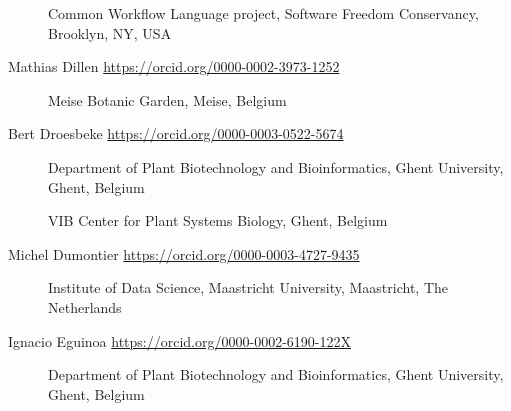 \begin{description}
Common Workflow Language project, Software Freedom Conservancy,
Brooklyn, NY, USA
\item[Mathias Dillen \url{https://orcid.org/0000-0002-3973-1252}]
Meise Botanic Garden, Meise, Belgium
\item[Bert Droesbeke \url{https://orcid.org/0000-0003-0522-5674}]
Department of Plant Biotechnology and Bioinformatics, Ghent University,
Ghent, Belgium

VIB Center for Plant Systems Biology, Ghent, Belgium
\item[Michel Dumontier \url{https://orcid.org/0000-0003-4727-9435}]
Institute of Data Science, Maastricht University, Maastricht, The
Netherlands
\item[Ignacio Eguinoa \url{https://orcid.org/0000-0002-6190-122X}]
Department of Plant Biotechnology and Bioinformatics, Ghent University,
Ghent, Belgium


\end{description}
